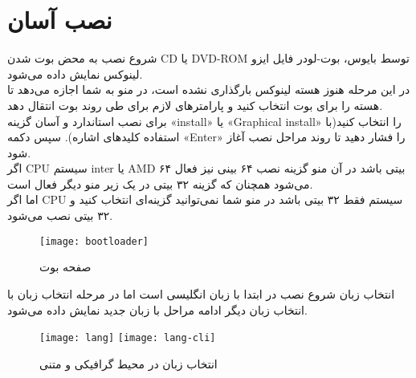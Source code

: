 \section{نصب آسان}
\begin{frame}{شروع نصب}
  به محض بوت شدن CD یا DVD-ROM توسط بایوس، بوت-لودر فایل ایزو لینوکس نمایش داده می‌شود.\\
  در این مرحله هنوز هسته لینوکس بارگذاری نشده است، در منو به شما اجازه می‌دهد تا هسته را برای بوت انتخاب کنید و پارامترهای لازم برای طی روند بوت انتقال دهد.\\
  برای نصب استاندارد و آسان گزینه «install» یا «Graphical install» را انتخاب کنید(با استفاده کلید‌های اشاره). سپس دکمه «Enter» را فشار دهید تا روند مراحل نصب آغاز شود.\\
  اگر CPU سیستم inter یا AMD ۶۴ بیتی باشد در آن منو گزینه نصب ۶۴ بینی نیز فعال می‌شود همچنان که گزینه ۳۲ بیتی در یک زیر منو دیگر فعال است.\\
  اما اگر CPU سیستم فقط ۳۲ بیتی باشد در منو شما نمی‌توانید گزینه‌ای انتخاب کنید و ۳۲ بیتی نصب می‌شود.\\
  \begin{figure}
    \centering
    \texttt{[image: bootloader]}
    \caption{صفحه بوت~\cite{fig:deb_bootscreen}}
  \end{figure}
\end{frame}
\begin{frame}{انتخاب زبان}
  شروع نصب در ابتدا با زبان انگلیسی است اما در مرحله انتخاب زبان با انتخاب زبان دیگر ادامه مراحل با زبان جدید نمایش داده می‌شود.\\
  \begin{figure}
    \texttt{[image: lang]}
    \texttt{[image: lang-cli]}
    \caption{انتخاب زبان در محیط گرافیکی و متنی~\cite{fig:deb_lang_gui}}
  \end{figure}
\end{frame}
